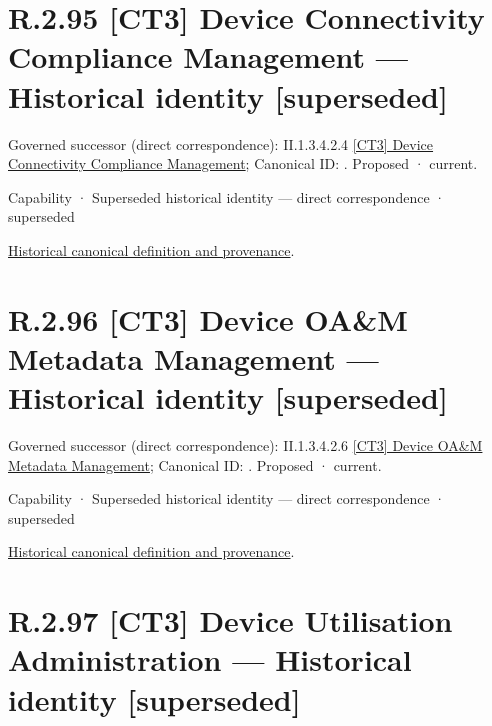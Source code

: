 \section*{R.2.95 [CT3] Device Connectivity Compliance Management — Historical identity [superseded]}
\label{navigation:R.2.95}

{\small Governed successor (direct correspondence): II.1.3.4.2.4 \hyperref[element:b16ab359030a4583868f3aac2221074e]{[CT3] Device Connectivity Compliance Management}; Canonical ID: \texttt{}. Proposed · current.}\par
\label{element:9225f083d3474715a75af2a827a4016d}
{\small Capability · Superseded historical identity — direct correspondence · superseded}\par
\href{../../../../continuum/strategy/capability/9225f083d3474715a75af2a827a4016d.md}{Historical canonical definition and provenance}.\par
\section*{R.2.96 [CT3] Device OA\&M Metadata Management — Historical identity [superseded]}
\label{navigation:R.2.96}

{\small Governed successor (direct correspondence): II.1.3.4.2.6 \hyperref[element:659bb194a7ef42ab9ba8a938adb5c179]{[CT3] Device OA\&M Metadata Management}; Canonical ID: \texttt{}. Proposed · current.}\par
\label{element:a398c72bef094dee96c96d97994449fb}
{\small Capability · Superseded historical identity — direct correspondence · superseded}\par
\href{../../../../continuum/strategy/capability/a398c72bef094dee96c96d97994449fb.md}{Historical canonical definition and provenance}.\par
\section*{R.2.97 [CT3] Device Utilisation Administration — Historical identity [superseded]}
\label{navigation:R.2.97}

